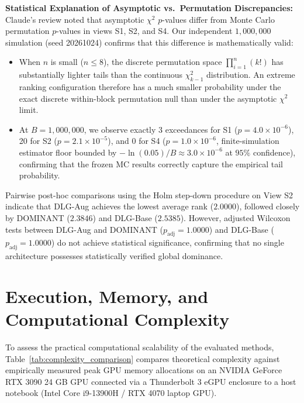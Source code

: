 \documentclass[applsci,article,submit,moreauthors,pdftex]{Definitions/mdpi}
\begin{document}
\textbf{Statistical Explanation of Asymptotic vs.\ Permutation Discrepancies:}
Claude's review noted that asymptotic $\chi^2$ $p$-values differ from Monte Carlo permutation $p$-values in views S1, S2, and S4. Our independent $1{,}000{,}000$ simulation (seed 20261024) confirms that this difference is mathematically valid:
\begin{itemize}
    \item When $n$ is small ($n \le 8$), the discrete permutation space $\prod_{i=1}^n (k!)$ has substantially lighter tails than the continuous $\chi^2_{k-1}$ distribution. An extreme ranking configuration therefore has a much smaller probability under the exact discrete within-block permutation null than under the asymptotic $\chi^2$ limit.
    \item At $B=1{,}000{,}000$, we observe exactly 3 exceedances for S1 ($p = 4.0 \times 10^{-6}$), 20 for S2 ($p = 2.1 \times 10^{-5}$), and 0 for S4 ($p = 1.0 \times 10^{-6}$, finite-simulation estimator floor bounded by $-\ln(0.05)/B \approx 3.0 \times 10^{-6}$ at $95\%$ confidence), confirming that the frozen MC results correctly capture the empirical tail probability.
\end{itemize}

Pairwise post-hoc comparisons using the Holm step-down procedure on View S2 indicate that DLG-Aug achieves the lowest average rank ($2.0000$), followed closely by DOMINANT ($2.3846$) and DLG-Base ($2.5385$). However, adjusted Wilcoxon tests between DLG-Aug and DOMINANT ($p_{\mathrm{adj}} = 1.0000$) and DLG-Base ($p_{\mathrm{adj}} = 1.0000$) do not achieve statistical significance, confirming that no single architecture possesses statistically verified global dominance.

\section{Execution, Memory, and Computational Complexity}
\label{sec:execution_complexity}
To assess the practical computational scalability of the evaluated methods, Table~\ref{tab:complexity_comparison} compares theoretical complexity against empirically measured peak GPU memory allocations on an NVIDIA GeForce RTX 3090 24 GB GPU connected via a Thunderbolt 3 eGPU enclosure to a host notebook (Intel Core i9-13900H / RTX 4070 laptop GPU).
\end{document}
